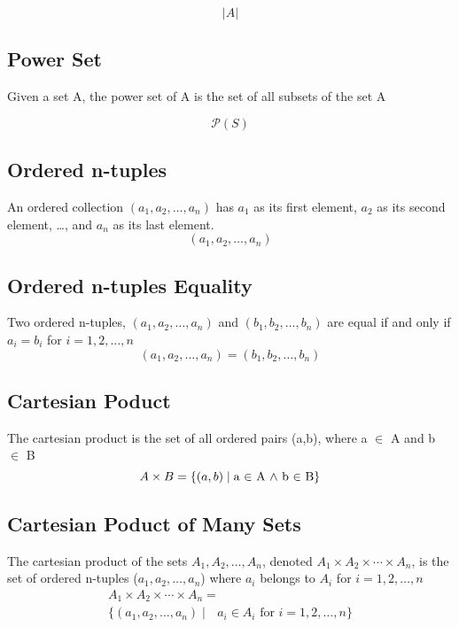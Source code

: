 \documentclass[12pt]{article}
\begin{document}
\begin{equation}
\left| {A} \right|
\end{equation}

\subsection{Power Set}
Given a set A, the power set of A is the set of all subsets of the set A 

\begin{equation}
\mathcal P \left({S}\right)
\end{equation}

\subsection{Ordered n-tuples}
An ordered collection $(a_1, a_2, \ldots, a_n)$ has $a_1$ as its first element, $a_2$ as its second element, \ldots, and $a_n$ as its last element.
\begin{equation}
(a_1, a_2, \ldots, a_n)
\end{equation}

\subsection{Ordered n-tuples Equality}
Two ordered n-tuples, $(a_1, a_2, \ldots, a_n)$ and $(b_1, b_2, \ldots, b_n)$ are equal
if and only if $a_i = b_i$ for $i = 1,2,\ldots,n$
\begin{equation}
(a_1, a_2, \ldots, a_n) = (b_1, b_2, \ldots, b_n)
\end{equation}

\subsection{Cartesian Poduct}
The cartesian product is the set of all ordered pairs (a,b), where a $\in$ A and b $\in$ B
\begin{equation}
A \times B = \{(a,b)\mid\text{a $\in$ A $\wedge$ b $\in$ B}\}
$$
$$\end{equation}

\subsection{Cartesian Poduct of Many Sets}
The cartesian product of the sets $A_1,A_2,\ldots,A_n$,
denoted $A_1 \times A_2 \times \cdots \times A_n$,
is 
the set of ordered n-tuples ($a_1,a_2,\ldots,a_n$)
where $a_i$ belongs to $A_i$ for $i = 1,2,\ldots,n$
\begin{subequations}
\begin{align*}
A_1 \times A_2 \times \cdots \times A_n =\\ 
\{ (a_1,a_2,\ldots,a_n)\mid\text{ $a_i \in A_i$ for $i = 1,2,\ldots,n$} \}
\end{align*}
\end{subequations}
\end{document}
